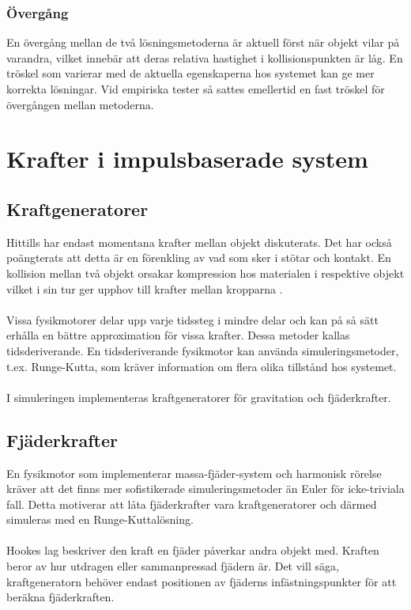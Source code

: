 \documentclass[a4paper,12pt,twopage,swedish]{article}
\begin{document}
\subsubsection{Övergång}
En övergång mellan de två lösningsmetoderna är aktuell först när objekt vilar på varandra, vilket innebär att deras relativa hastighet i kollisionspunkten är låg.
En tröskel som varierar med de aktuella egenskaperna hos systemet kan ge mer korrekta lösningar. Vid empiriska tester så sattes emellertid en fast tröskel för övergången mellan metoderna.

\section{Krafter i impulsbaserade system}

\subsection{Kraftgeneratorer}

Hittills har endast momentana krafter mellan objekt diskuterats. Det har också poängterats att detta är en förenkling av vad som sker i stötar och kontakt. En kollision mellan två objekt orsakar kompression hos materialen i respektive objekt vilket i sin tur ger upphov till krafter mellan kropparna \cite{newton87}.
\\
\\Vissa fysikmotorer delar upp varje tidssteg i mindre delar och kan på så sätt erhålla en bättre approximation för vissa krafter. Dessa metoder kallas tidsderiverande. En tidsderiverande fysikmotor kan använda simuleringsmetoder, t.ex. Runge-Kutta, som kräver information om  flera olika tillstånd hos systemet.
\\
\\I simuleringen implementeras kraftgeneratorer för gravitation och fjäderkrafter.


\subsection{Fjäderkrafter}
En fysikmotor som implementerar massa-fjäder-system och harmonisk rörelse kräver att det finns mer sofistikerade simuleringsmetoder än Euler för icke-triviala fall. Detta motiverar att låta fjäderkrafter vara kraftgeneratorer och därmed simuleras med en Runge-Kuttalösning.
\\
\\Hookes lag beskriver den kraft en fjäder påverkar andra objekt med. Kraften beror av hur utdragen eller sammanpressad fjädern är. Det vill säga, kraftgeneratorn behöver endast positionen av fjäderns infästningspunkter för att beräkna fjäderkraften. 
\end{document}
